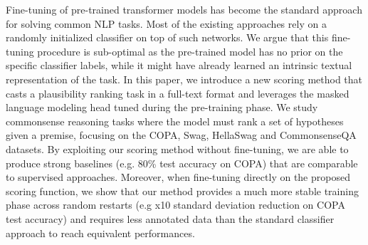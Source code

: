 Fine-tuning of pre-trained transformer models has become the standard approach for solving common NLP tasks. Most of the existing approaches rely on a randomly initialized classifier on top of such networks. We argue that this fine-tuning procedure is sub-optimal as the pre-trained model has no prior on the specific classifier labels, while it might have already learned an intrinsic textual representation of the task. In this paper, we introduce a new scoring method that casts a plausibility ranking task in a full-text format and leverages the masked language modeling head tuned during the pre-training phase. We study commonsense reasoning tasks where the model must rank a set of hypotheses given a premise, focusing on the COPA, Swag, HellaSwag and CommonsenseQA datasets. By exploiting our scoring method without fine-tuning, we are able to produce strong baselines (e.g. 80\% test accuracy on COPA) that are comparable to supervised approaches. Moreover, when fine-tuning directly on the proposed scoring function, we show that our method provides a much more stable training phase across random restarts (e.g  x10 standard deviation reduction on COPA test accuracy) and requires less annotated data than the standard classifier approach to reach equivalent performances.
